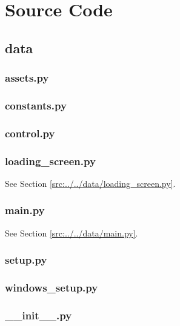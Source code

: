 \documentclass[../main/main.tex]{subfiles}
\begin{document}
\newpage

\chapter{Source Code}

\section{data}
\subsection{assets.py}

\label{src:data/assets.py}

\subsection{constants.py}

\label{src:data/constants.py}

\subsection{control.py}

\label{src:data/control.py}

\subsection{loading\_screen.py}
See Section \ref{src:../../data/loading_screen.py}.

\subsection{main.py}
See Section \ref{src:../../data/main.py}.

\subsection{setup.py}

\label{src:data/setup.py}

\subsection{windows\_setup.py}

\label{src:data/windows_setup.py}

\subsection{\_\_init\_\_.py}

\label{src:data/__init__.py}
\end{document}
